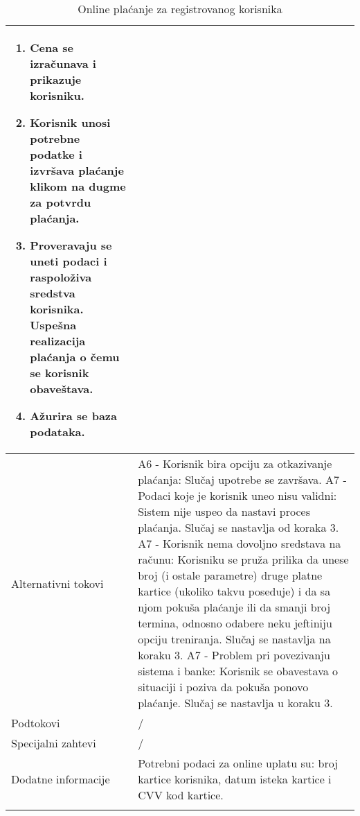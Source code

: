 \documentclass[../main.tex]{subfiles}
\begin{document}
\begin{longtable}{| p{} | p{} |}
\begin{enumerate}
 		\item Cena se izračunava i prikazuje korisniku. %
		\item Korisnik unosi potrebne podatke i izvršava plaćanje klikom na dugme za potvrdu plaćanja.
		\item Proveravaju se uneti podaci i raspoloživa sredstva korisnika. Uspešna realizacija plaćanja o čemu se korisnik obaveštava.
		\item Ažurira se baza podataka. %
    \end{enumerate}\\
\hline
    Alternativni tokovi &
       		A6 - Korisnik bira opciju za otkazivanje plaćanja: Slučaj upotrebe se završava.
        	A7 - Podaci koje je korisnik uneo nisu validni:  Sistem nije uspeo da nastavi proces plaćanja. Slučaj se nastavlja od koraka 3.
        	A7 - Korisnik nema dovoljno sredstava na računu: Korisniku se pruža prilika da unese broj (i ostale parametre) druge platne kartice (ukoliko takvu poseduje) i da sa njom pokuša plaćanje ili da smanji broj termina, odnosno odabere neku jeftiniju opciju treniranja. Slučaj se nastavlja na koraku 3.
        	A7 - Problem pri povezivanju sistema i banke: Korisnik se obavestava o situaciji i poziva da pokuša ponovo plaćanje. Slučaj se nastavlja u koraku 3.\\
\hline
    Podtokovi & / \\
\hline
    Specijalni zahtevi & / \\
\hline
    Dodatne informacije & Potrebni podaci za online uplatu su: broj kartice korisnika, datum isteka kartice i CVV kod kartice. \\
\hline
\caption{Online plaćanje za registrovanog korisnika} %
\label{tab:myfirstlongtable}
\end{longtable}

\end{document}
